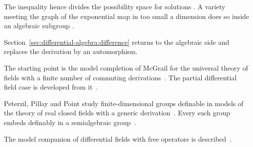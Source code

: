The inequality hence divides the possibility space for solutions
\cite[Theorem~2.2, p.~6]{Aslanyan2018}. A variety meeting the graph of the
exponential map in too small a dimension does so inside an algebraic subgroup
\cite[Theorem~2.2, p.~6]{Aslanyan2018}.

Section~\ref{sec:differential-algebra:difference} returns to the
algebraic side and replaces the derivation by an automorphism.

The starting point is the model completion of McGrail for the universal theory
of fields with a finite
number of commuting derivations~\cite{WlModelTheoryOfPartialDifferenti2019}. The partial
differential field case is developed from
it~\cite{WlModelTheoryOfPartialDifferenti2019}.

Peterzil, Pillay and Point study finite-dimensional groups definable in models
of the theory of real closed fields with a generic derivation~\cite{WlOnDefinableGroupsInRealClosedF2022}. Every such group
embeds definably in a semialgebraic
group~\cite{WlOnDefinableGroupsInRealClosedF2022}.

The model companion of differential fields with free operators is
described~\cite{WlTheModelCompanionOfDifferentia2020}.
